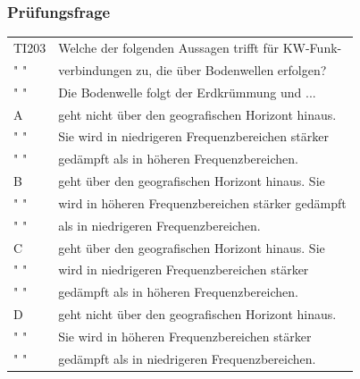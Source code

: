 \begin{frame}
    \frametitle{Prüfungsfrage}

    \begin{center}
    \begin{tabular}{l||l}\hline
        TI203 & Welche der folgenden Aussagen trifft für KW-Funk- \\
         " "  & verbindungen zu, die über Bodenwellen erfolgen? \\ 
         " "  & Die Bodenwelle folgt der Erdkrümmung und ...\\\hline\hline
         A 	  & geht nicht über den geografischen Horizont hinaus. \\
         " "  & Sie wird in niedrigeren Frequenzbereichen stärker \\ 
         " "  & gedämpft als in höheren Frequenzbereichen.\\\hline
         B 	  & geht über den geografischen Horizont hinaus. Sie \\
         " "  & wird in höheren Frequenzbereichen stärker gedämpft \\ 
         " "  & als in niedrigeren Frequenzbereichen.\\\hline
         C	  & geht über den geografischen Horizont hinaus. Sie \\
         " "  & wird in niedrigeren Frequenzbereichen stärker \\ 
         " "  & gedämpft als in höheren Frequenzbereichen.\\\hline
         D 	  & geht nicht über den geografischen Horizont hinaus. \\
         " "  & Sie wird in höheren Frequenzbereichen stärker \\ 
         " "  & gedämpft als in niedrigeren Frequenzbereichen.\\\hline
    \end{tabular}
 	\end{center}
\end{frame}

